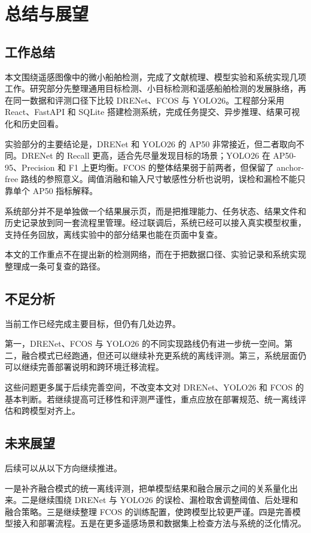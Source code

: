 \section{总结与展望}\label{sec:conclusion}

\subsection{工作总结}

本文围绕遥感图像中的微小船舶检测，完成了文献梳理、模型实验和系统实现几项工作。研究部分先整理通用目标检测、小目标检测和遥感船舶检测的发展脉络，再在同一数据和评测口径下比较 DRENet、FCOS 与 YOLO26。工程部分采用 React、FastAPI 和 SQLite 搭建检测系统，完成任务提交、异步推理、结果可视化和历史回看。

实验部分的主要结论是，DRENet 和 YOLO26 的 AP50 非常接近，但二者取向不同。DRENet 的 Recall 更高，适合先尽量发现目标的场景；YOLO26 在 AP50-95、Precision 和 F1 上更均衡。FCOS 的整体结果弱于前两者，但保留了 anchor-free 路线的参照意义。阈值消融和输入尺寸敏感性分析也说明，误检和漏检不能只靠单个 AP50 指标解释。

系统部分并不是单独做一个结果展示页，而是把推理能力、任务状态、结果文件和历史记录放到同一套流程里管理。经过联调后，系统已经可以接入真实模型权重，支持任务回放，离线实验中的部分结果也能在页面中复查。

本文的工作重点不在提出新的检测网络，而在于把数据口径、实验记录和系统实现整理成一条可复查的路径。

\subsection{不足分析}

当前工作已经完成主要目标，但仍有几处边界。

第一，DRENet、FCOS 与 YOLO26 的不同实现路线仍有进一步统一空间。第二，融合模式已经跑通，但还可以继续补充更系统的离线评测。第三，系统层面仍可以继续完善部署说明和跨环境迁移流程。

这些问题更多属于后续完善空间，不改变本文对 DRENet、YOLO26 和 FCOS 的基本判断。若继续提高可迁移性和评测严谨性，重点应放在部署规范、统一离线评估和跨模型对齐上。

\subsection{未来展望}

后续可以从以下方向继续推进。

一是补齐融合模式的统一离线评测，把单模型结果和融合展示之间的关系量化出来。二是继续围绕 DRENet 与 YOLO26 的误检、漏检取舍调整阈值、后处理和融合策略。三是继续整理 FCOS 的训练配置，使跨模型比较更严谨。四是完善模型接入和部署流程。五是在更多遥感场景和数据集上检查方法与系统的泛化情况。

